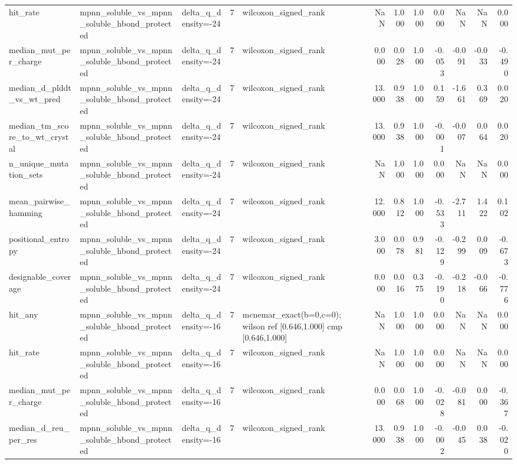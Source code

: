 \begin{table}
{\begin{tabular}{lllrlrrrrrrr}
hit\_rate & mpnn\_soluble\_vs\_mpnn\_soluble\_hbond\_protected & delta\_q\_density=-24 & 7 & wilcoxon\_signed\_rank & NaN & 1.000 & 1.000 & 0.000 & NaN & NaN & 0.000 \\
median\_mut\_per\_charge & mpnn\_soluble\_vs\_mpnn\_soluble\_hbond\_protected & delta\_q\_density=-24 & 7 & wilcoxon\_signed\_rank & 0.000 & 0.028 & 1.000 & -0.053 & -0.091 & -0.033 & -0.490 \\
median\_d\_plddt\_vs\_wt\_pred & mpnn\_soluble\_vs\_mpnn\_soluble\_hbond\_protected & delta\_q\_density=-24 & 7 & wilcoxon\_signed\_rank & 13.000 & 0.938 & 1.000 & 0.159 & -1.661 & 0.369 & 0.020 \\
median\_tm\_score\_to\_wt\_crystal & mpnn\_soluble\_vs\_mpnn\_soluble\_hbond\_protected & delta\_q\_density=-24 & 7 & wilcoxon\_signed\_rank & 13.000 & 0.938 & 1.000 & -0.001 & -0.007 & 0.064 & 0.020 \\
n\_unique\_mutation\_sets & mpnn\_soluble\_vs\_mpnn\_soluble\_hbond\_protected & delta\_q\_density=-24 & 7 & wilcoxon\_signed\_rank & NaN & 1.000 & 1.000 & 0.000 & NaN & NaN & 0.000 \\
mean\_pairwise\_hamming & mpnn\_soluble\_vs\_mpnn\_soluble\_hbond\_protected & delta\_q\_density=-24 & 7 & wilcoxon\_signed\_rank & 12.000 & 0.812 & 1.000 & -0.533 & -2.711 & 1.422 & 0.102 \\
positional\_entropy & mpnn\_soluble\_vs\_mpnn\_soluble\_hbond\_protected & delta\_q\_density=-24 & 7 & wilcoxon\_signed\_rank & 3.000 & 0.078 & 0.981 & -0.129 & -0.299 & 0.009 & -0.673 \\
designable\_coverage & mpnn\_soluble\_vs\_mpnn\_soluble\_hbond\_protected & delta\_q\_density=-24 & 7 & wilcoxon\_signed\_rank & 0.000 & 0.016 & 0.375 & -0.190 & -0.218 & -0.066 & -0.776 \\
hit\_any & mpnn\_soluble\_vs\_mpnn\_soluble\_hbond\_protected & delta\_q\_density=-16 & 7 & mcnemar\_exact(b=0,c=0); wilson ref [0.646,1.000] cmp [0.646,1.000] & NaN & 1.000 & 1.000 & 0.000 & NaN & NaN & 0.000 \\
hit\_rate & mpnn\_soluble\_vs\_mpnn\_soluble\_hbond\_protected & delta\_q\_density=-16 & 7 & wilcoxon\_signed\_rank & NaN & 1.000 & 1.000 & 0.000 & NaN & NaN & 0.000 \\
median\_mut\_per\_charge & mpnn\_soluble\_vs\_mpnn\_soluble\_hbond\_protected & delta\_q\_density=-16 & 7 & wilcoxon\_signed\_rank & 0.000 & 0.068 & 1.000 & -0.028 & -0.081 & 0.000 & -0.367 \\
median\_d\_reu\_per\_res & mpnn\_soluble\_vs\_mpnn\_soluble\_hbond\_protected & delta\_q\_density=-16 & 7 & wilcoxon\_signed\_rank & 13.000 & 0.938 & 1.000 & -0.002 & -0.045 & 0.038 & -0.020 \\

\end{tabular}}
\end{table}
